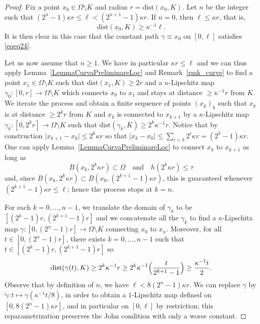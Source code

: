 \documentclass[12pt]{article}
\theoremstyle{definition}
\theoremstyle{remark}
\numberwithin{equation}{section}
\newcommand{\abs}[1]{\lvert #1 \rvert}
\begin{document}
\begin{proof}
    Fix a point $x_0 \in \Omega \setminus K$ and radius $r = \mathrm{dist}(x_0,K)$. Let $n$ be the integer such that
    $(2^n - 1) \kappa r \leq \ell < (2^{n+1} - 1) \kappa r$.
    If $n = 0$, then $\ell \leq \kappa r$, that is,
    \begin{equation}
        \mathrm{dist}(x_0,K) \geq \kappa^{-1} \ell.
    \end{equation}
    It is then clear in this case that the constant path $\gamma \equiv x_0$ on $[0,\ell]$ satisfies \eqref{eqeq24}.

    Let us now assume that $n \geq 1$. We have in particular $\kappa r \leq \ell$ and we can thus apply
    Lemma~\ref{LemmaCurvaPreliminareLoc} and Remark~\ref{rmk_curve} to find a point $x_1 \in \Omega \setminus K$ such that $\mathrm{dist}(x_1,K) \geq 2r$ and
    a $\kappa$-Lipschitz map $\gamma_0 : [0,r] \longrightarrow \Omega \setminus K$ which connects $x_0$ to $x_1$ and stays at distance $\geq \kappa^{-1} r$ from $K$. 
    We iterate the process and obtain a finite sequence of points $(x_k)_k$ such that $x_k$ is at distance $\geq 2^k r$
    from $K$
    and $x_k$ is connected to $x_{k+1}$ by a $\kappa$-Lipschitz map $\gamma_k : [0,2^k r] \longrightarrow \Omega
    \setminus K$ such that $\mathrm{dist}(\gamma_k,K) \geq 2^k \kappa^{-1} r$.
    Notice that by construction $\abs{x_{k+1} - x_k} \leq 2^k \kappa r$ so that $\abs{x_k - x_0} \leq \sum_{i < k} 2^i
    \kappa r = (2^k - 1) \kappa
    r$. One can apply Lemma~\ref{LemmaCurvaPreliminareLoc} to connect $x_k$ to $x_{k+1}$ as long as
    \begin{equation}
        B(x_k,2^k \kappa r) \subset \Omega \quad \text{and} \quad h(2^k \kappa r) \leq \tau
    \end{equation}
    and, since $B(x_k,2^k \kappa r) \subset B(x_0,(2^{k+1} - 1) \kappa r)$, this is guaranteed whenever $(2^{k+1} - 1) \kappa r
    \leq \ell$; hence the process stops at $k = n$.

    For each $k = 0,\ldots,n-1$, we translate the domain of
    $\gamma_k$ to be $[(2^k - 1)r, (2^{k+1}-1)r]$ and we concatenate all the $\gamma_k$ to find a $\kappa$-Lipschitz map
    $\gamma : [0,(2^n - 1)r] \longrightarrow \Omega\setminus K$ connecting $x_0$ to $x_n$. Moreover, for all $t \in [0,(2^n - 1)r]$, there exists $k = 0,\ldots,n-1$ such that $t \in [(2^k-1)r,(2^{k+1}-1)r]$ so
    \begin{equation}
        \mathrm{dist}(\gamma(t),K) \geq 2^k \kappa^{-1} r \geq 2^k \kappa^{-1} \Bigl(\frac{t}{2^{k+1}-1}\Bigr) \geq
        \frac{\kappa^{-1} t}{2}.
    \end{equation}
    Observe that by definition of $n$, we have $\ell < 8(2^n - 1) \kappa r$. We can replace $\gamma$ by $\tilde \gamma : t
    \mapsto \gamma(\kappa^{-1}t/8)$, in order to obtain a $1$-Lipschitz map defined on $[0,8(2^n - 1)\kappa r]$, and in
    particular on $[0,\ell]$ by restriction; this reparametrization preserves the John condition with only a worse constant.
\end{proof} 
\end{document}
